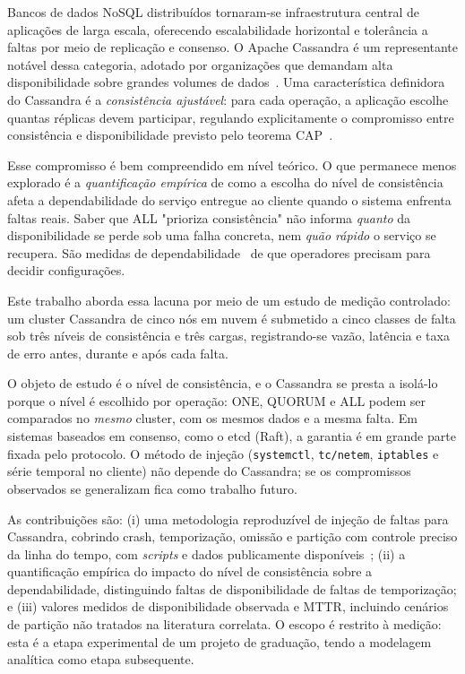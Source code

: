 \documentclass[runningheads]{llncs}
\begin{document}
Bancos de dados NoSQL distribuídos tornaram-se infraestrutura central de
aplicações de larga escala, oferecendo escalabilidade horizontal e tolerância a
faltas por meio de replicação e consenso. O Apache Cassandra é um representante
notável dessa categoria, adotado por organizações que demandam alta
disponibilidade sobre grandes volumes de dados~\cite{lakshman2010cassandra}. Uma
característica definidora do Cassandra é a \emph{consistência ajustável}: para
cada operação, a aplicação escolhe quantas réplicas devem participar, regulando
explicitamente o compromisso entre consistência e disponibilidade previsto pelo
teorema CAP~\cite{brewer2000cap,gilbert2002cap}.

Esse compromisso é bem compreendido em nível teórico. O que permanece menos
explorado é a \emph{quantificação empírica} de como a escolha do nível de
consistência afeta a dependabilidade do serviço entregue ao cliente quando o
sistema enfrenta faltas reais. Saber que ALL "prioriza consistência" não informa
\emph{quanto} da disponibilidade se perde sob uma falha concreta, nem \emph{quão
rápido} o serviço se recupera. São medidas de
dependabilidade~\cite{avizienis2004basic,meyer1980} de que operadores precisam
para decidir configurações.

Este trabalho aborda essa lacuna por meio de um estudo de medição controlado: um
cluster Cassandra de cinco nós em nuvem é submetido a cinco classes de falta sob
três níveis de consistência e três cargas, registrando-se vazão, latência e taxa
de erro antes, durante e após cada falta.

O objeto de estudo é o nível de consistência, e o Cassandra se presta a isolá-lo
porque o nível é escolhido por operação: ONE, QUORUM e ALL podem ser comparados
no \emph{mesmo} cluster, com os mesmos dados e a mesma falta. Em sistemas
baseados em consenso, como o etcd (Raft), a garantia é em grande parte fixada
pelo protocolo. O método de injeção (\texttt{systemctl}, \texttt{tc/netem},
\texttt{iptables} e série temporal no cliente) não depende do Cassandra; se os
compromissos observados se generalizam fica como trabalho futuro.

As contribuições são: (i) uma metodologia reproduzível de injeção de faltas para
Cassandra, cobrindo crash, temporização, omissão e partição com controle preciso
da linha do tempo, com \emph{scripts} e dados publicamente
disponíveis~\cite{artifact}; (ii) a quantificação empírica do impacto do nível de
consistência sobre a dependabilidade, distinguindo faltas de disponibilidade de
faltas de temporização; e (iii) valores medidos de disponibilidade observada e
MTTR, incluindo cenários de partição não tratados na literatura correlata. O
escopo é restrito à medição: esta é a etapa experimental de um projeto de
graduação, tendo a modelagem analítica como etapa subsequente.
\end{document}
